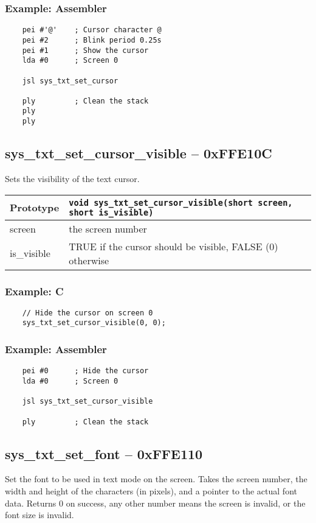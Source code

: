 \subsubsection*{Example: Assembler}
\begin{verbatim}
	pei #'@'	; Cursor character @
	pei #2		; Blink period 0.25s
    pei #1      ; Show the cursor
    lda #0      ; Screen 0

    jsl sys_txt_set_cursor

    ply         ; Clean the stack
	ply
	ply
\end{verbatim}


\subsection*{sys\_txt\_set\_cursor\_visible -- 0xFFE10C}
Sets the visibility of the text cursor.

\bigskip

\begin{tabular}{|l||l|} \hline
Prototype & \lstinline!void sys_txt_set_cursor_visible(short screen, short is_visible)! \\ \hline
screen & the screen number \\ \hline
is\_visible & TRUE if the cursor should be visible, FALSE (0) otherwise \\ \hline
\end{tabular}

\subsubsection*{Example: C}
\begin{lstlisting}
    // Hide the cursor on screen 0
    sys_txt_set_cursor_visible(0, 0);
\end{lstlisting}

\subsubsection*{Example: Assembler}
\begin{verbatim}
    pei #0      ; Hide the cursor
    lda #0      ; Screen 0

    jsl sys_txt_set_cursor_visible

    ply         ; Clean the stack
\end{verbatim}


\subsection*{sys\_txt\_set\_font -- 0xFFE110}
Set the font to be used in text mode on the screen. Takes the screen number, the width and height of the characters (in pixels), and a pointer to the actual font data. Returns 0 on success, any other number means the screen is invalid, or the font size is invalid.

